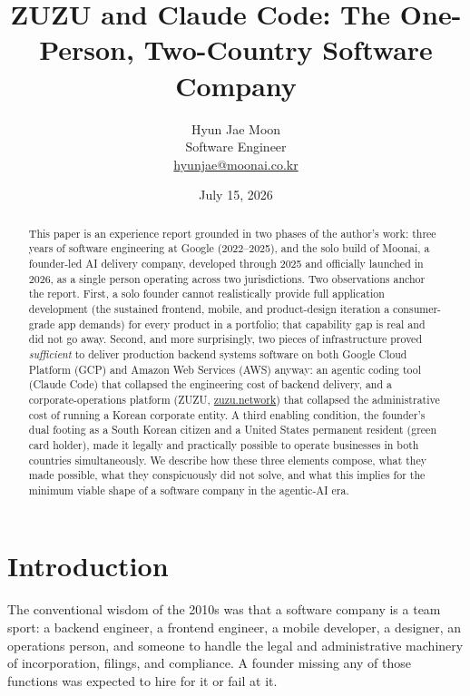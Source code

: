 \documentclass{article}
\title{ZUZU and Claude Code: The One-Person, Two-Country Software Company}
\author{Hyun Jae Moon \\ \small Software Engineer \\ \small \href{mailto:hyunjae@moonai.co.kr}{hyunjae@moonai.co.kr}}
\date{July 15, 2026}
\begin{document}
\maketitle

\begin{abstract}
This paper is an experience report grounded in two phases of the author's work: three years of software engineering at Google (2022--2025), and the solo build of Moonai, a founder-led AI delivery company, developed through 2025 and officially launched in 2026, as a single person operating across two jurisdictions. Two observations anchor the report. First, a solo founder cannot realistically provide full application development (the sustained frontend, mobile, and product-design iteration a consumer-grade app demands) for every product in a portfolio; that capability gap is real and did not go away. Second, and more surprisingly, two pieces of infrastructure proved \emph{sufficient} to deliver production backend systems software on both Google Cloud Platform (GCP) and Amazon Web Services (AWS) anyway: an agentic coding tool (Claude Code) that collapsed the engineering cost of backend delivery, and a corporate-operations platform (ZUZU, \href{https://zuzu.network}{zuzu.network}) that collapsed the administrative cost of running a Korean corporate entity. A third enabling condition, the founder's dual footing as a South Korean citizen and a United States permanent resident (green card holder), made it legally and practically possible to operate businesses in both countries simultaneously. We describe how these three elements compose, what they made possible, what they conspicuously did not solve, and what this implies for the minimum viable shape of a software company in the agentic-AI era.
\end{abstract}

\section{Introduction}

The conventional wisdom of the 2010s was that a software company is a team sport: a backend engineer, a frontend engineer, a mobile developer, a designer, an operations person, and someone to handle the legal and administrative machinery of incorporation, filings, and compliance. A founder missing any of those functions was expected to hire for it or fail at it.
\end{document}
